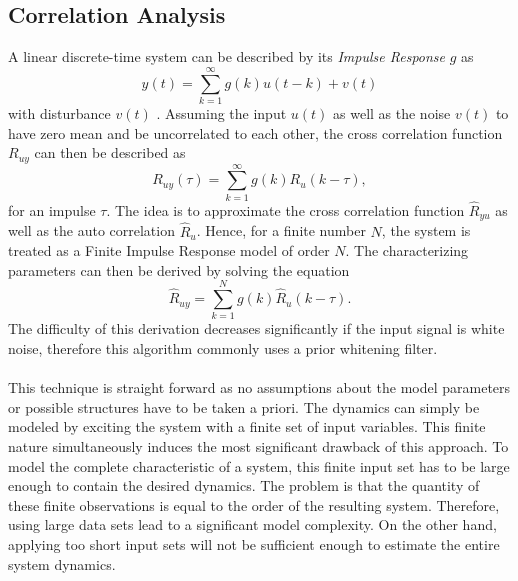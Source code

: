 \documentclass[english]{isasthesis}
\begin{document}
    	\subsection{Correlation Analysis} \label{imp}
    	A linear discrete-time system can be described by its \textit{Impulse Response} $g$ as 
    	\begin{equation}
    	y(t) = \sum_{k = 1}^{\infty}g(k)u(t-k)+v(t)
    	\end{equation}
    	with disturbance $v(t)$ \cite{ljung1999system}. Assuming the input $u(t)$ as well as the noise $v(t)$ to have zero mean and be uncorrelated to each other, the cross correlation function $R_{uy}$ can then be described as
    	\begin{equation}
    	R_{uy}(\tau) = \sum_{k = 1}^{\infty}g(k)R_u(k - \tau),
    	\end{equation}
    	for an impulse $\tau$. The idea is to approximate the cross correlation function $\hat{R}_{yu}$ as well as the auto correlation $\hat{R}_u$. Hence, for a finite number $N$, the system is treated as a Finite Impulse Response model of order $N$. The characterizing parameters can then be derived by solving the equation
    	\begin{equation}
    	\hat{R}_{uy} = \sum_{k = 1}^{N} g(k)\hat{R}_u(k - \tau). 
    	\end{equation}
    	The difficulty of this derivation decreases significantly if the input signal is white noise, therefore this algorithm commonly uses a prior whitening filter. \\ \\
    	This technique is straight forward as no assumptions about the model parameters or possible structures have to be taken a priori. The dynamics can simply be modeled by exciting the system with a finite set of input variables. This finite nature simultaneously induces the most significant drawback of this approach. To model the complete characteristic of a system, this finite input set has to be large enough to contain the desired dynamics. The problem is that the quantity of these finite observations is equal to the order of the resulting system. Therefore, using large data sets lead to a significant model complexity. On the other hand, applying too short input sets will not be sufficient enough to estimate the entire system dynamics. 
\end{document}
